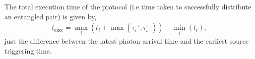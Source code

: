 The total execution time of the protocol (i.e time taken to successfully distribute an entangled pair) is given by,
\begin{align}
	t_\mathrm{exec} = \max_i(t_i +\max(\tau_i^\rightarrow,\tau_i^\leftarrow)) - \min_i(t_i
	),
\end{align}
just the difference between the latest photon arrival time and the earliest source triggering time.
